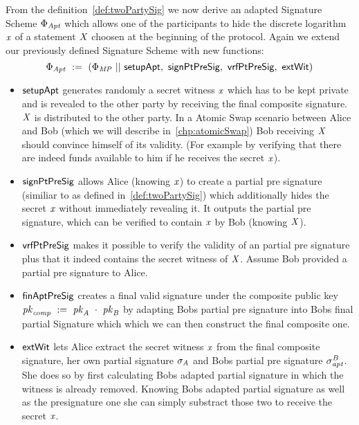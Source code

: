\begin{definition}
    \label{def:twoPartyFixedWitAptSig}
    From the definition~\ref{def:twoPartySig} we now derive an adapted Signature Scheme $\Phi_{\mathit{Apt}}$ which allows one of the participants to hide the discrete logarithm $\mathit{x}$ of a statement $\mathit{X}$ choosen
    at the beginning of the protocol. Again we extend our previously defined Signature Scheme with new functions:
    \[ \Phi_{\mathit{Apt}} ~:=~ (\Phi_{\mathit{MP}} ~||~ \mathsf{setupApt} ,~ \mathsf{signPtPreSig} ,~ \mathsf{vrfPtPreSig} ,~ \mathsf{extWit}) \]
    \begin{itemize}
        \item $\mathsf{setupApt}$ generates randomly a secret witness $\mathit{x}$ which has to be kept private and is revealed to the other party by receiving the final composite signature. $\mathit{X}$ is distributed
        to the other party. In a Atomic Swap scenario between Alice and Bob (which we will describe in~\ref{chp:atomicSwap}) Bob receiving $\mathit{X}$ should convince himself of its validity. (For example by verifying that
        there are indeed funds available to him if he receives the secret $\mathit{x}$).
        \item $\mathsf{signPtPreSig}$ allows Alice (knowing $\mathit{x}$) to create a partial pre signature (similiar to as defined in~\ref{def:twoPartySig}) which additionally hides the secret $\mathit{x}$ without immediately revealing it.
        It outputs the partial pre signature, which can be verified to contain $\mathit{x}$ by Bob (knowing $\mathit{X}$).
        \item $\mathsf{vrfPtPreSig}$ makes it possible to verify the validity of an partial pre signature plus that it indeed contains the secret witness of $\mathit{X}$. Assume Bob provided a partial pre signature to Alice.
        \item $\mathsf{finAptPreSig}$ creates a final valid signature under the composite public key $\mathit{pk}_{\mathit{comp}} ~:=~ \mathit{pk}_{\mathit{A}} ~\cdot~ \mathit{pk}_{\mathit{B}}$ by adapting Bobs partial pre signature
        into Bobs final partial Signature which which we can then construct the final composite one.
        \item $\mathsf{extWit}$ lets Alice extract the secret witness $\mathit{x}$ from the final composite signature, her own partial signature $\sigma_{\mathit{A}}$ and Bobs partial pre signature $\sigma^{\mathit{B}}_{\mathit{apt}}$. She does
        so by first calculating Bobs adapted partial signature in which the witness is already removed. Knowing Bobs adapted partial signature as well as the presignature one she
        can simply substract those two to receive the secret $\mathit{x}$.
    \end{itemize}
\end{definition}

